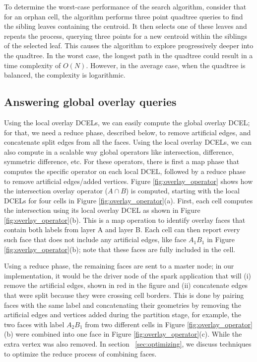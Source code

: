 To determine the worst-case performance of the search algorithm, consider that for an orphan cell, the algorithm performs three point quadtree queries to find the sibling leaves containing the centroid. It then selects one of these leaves and repeats the process, querying three points for a new centroid within the siblings of the selected leaf. This causes the algorithm to explore progressively deeper into the quadtree. In the worst case, the longest path in the quadtree could result in a time complexity of $O(N)$. However, in the average case, when the quadtree is balanced, the complexity is logarithmic.

\subsection{Answering global overlay queries} %
Using the local overlay DCELs, we can easily compute the global overlay DCEL; for that, we need a reduce phase, described below, to remove artificial edges, and 
concatenate split edges from all the faces. Using the local overlay DCELs, we can also compute in a scalable way global operators like intersection, difference, 
symmetric difference, etc. For these operators, there is first a map phase that computes the specific operator on each local DCEL, followed by a reduce phase to 
remove artificial edges/added vertices.
Figure \ref{fig:overlay_operator} shows how the intersection overlay operator ($A \cap B$) is computed, starting with the local DCELs for four cells in Figure 
\ref{fig:overlay_operator}(a). First, each cell computes the intersection using its local overlay DCEL as shown in Figure \ref{fig:overlay_operator}(b). This is 
a map operation to identify overlay faces that contain both labels from layer A and layer B. Each cell can then report every such face that does not include any 
artificial edges, like face $A_1B_1$ in Figure \ref{fig:overlay_operator}(b); note that these faces are fully included in the cell. 

Using a reduce phase, the remaining faces are sent to a master node; in our implementation, it would be the driver node of the spark application that will (i) 
remove the artificial edges, shown in red in the figure and (ii) concatenate edges that were split because they were crossing cell borders. This is done by 
pairing faces with the same label and concatenating their geometries by removing the artificial edges and vertices added during the partition stage, for 
example, the two faces with label $A_2B_1$ from two different cells in Figure \ref{fig:overlay_operator}(b) were combined into one face in Figure 
\ref{fig:overlay_operator}(c). While the extra vertex was also removed. In section ~\ref{sec:optimizing}, we discuss techniques to optimize the reduce process 
of combining faces.

